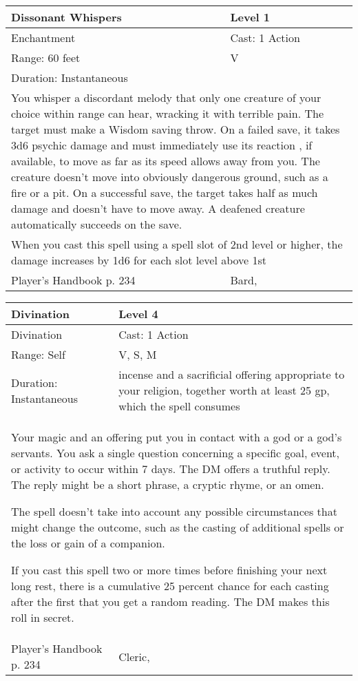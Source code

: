 \documentclass[11pt]{report}
\begin{document}
\begin{table}[H]
	\begin{tabular}{||p{6cm}|p{6cm}||}
		\hline\hline
		\bf{Dissonant Whispers} & Level 1\\ \hline
		Enchantment & Cast: 1 Action\\ \hline
		Range: 60 feet & V\\ \hline
		Duration: Instantaneous & \\ \hline
		\multicolumn{2}{||p{12cm}||}{You whisper a discordant melody that only one creature of your choice within range can hear, wracking it with terrible pain. 
The target must make a Wisdom saving throw. On a failed save, it takes 3d6 psychic damage and must immediately use its reaction , if available, to move as far as its speed allows away from you. The creature doesn’t move into obviously dangerous ground, such as a fire or a pit. On a successful save, the target takes half as much damage and doesn’t have to move away. A deafened creature automatically succeeds on the save.}\\ \hline
		\multicolumn{2}{||p{12cm}||}{When you cast this spell using a spell slot of 2nd level or higher, the damage increases by 1d6 for each slot level above 1st}\\ \hline
Player's Handbook p. 234 & Bard, \\ \hline\hline
	\end{tabular}
\end{table}

\begin{table}[H]
	\begin{tabular}{||p{6cm}|p{6cm}||}
		\hline\hline
		\bf{Divination} & Level 4\\ \hline
		Divination & Cast: 1 Action\\ \hline
		Range: Self & V, S, M \\ \hline
		Duration: Instantaneous & incense and a sacrificial offering appropriate to your religion, together worth at least 25 gp, which the spell consumes\\ \hline
		\multicolumn{2}{||p{12cm}||}{Your magic and an offering put you in contact with a god or a god’s servants. You ask a single question concerning a specific goal, event, or activity to occur within 7 days. The DM offers a truthful reply. The reply might be a short phrase, a cryptic rhyme, or an omen. 

The spell doesn’t take into account any possible circumstances that might change the outcome, such as the casting of additional spells or the loss or gain of a companion. 

If you cast this spell two or more times before finishing your next long rest, there is a cumulative 25 percent chance for each casting after the first that you get a random reading. The DM makes this roll in secret.}\\ \hline
Player's Handbook p. 234 & Cleric, \\ \hline\hline
	\end{tabular}
\end{table}
\end{document}
